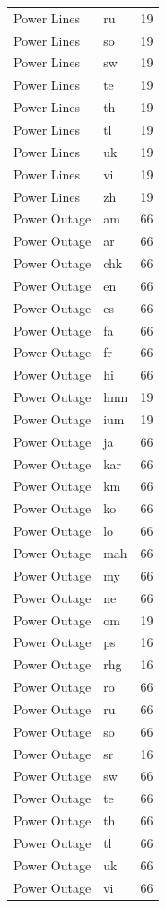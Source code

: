 \begin{longtable}{p{3cm} p{3cm} r}
Power Lines & ru & 19 \\
Power Lines & so & 19 \\
Power Lines & sw & 19 \\
Power Lines & te & 19 \\
Power Lines & th & 19 \\
Power Lines & tl & 19 \\
Power Lines & uk & 19 \\
Power Lines & vi & 19 \\
Power Lines & zh & 19 \\
Power Outage & am & 66 \\
Power Outage & ar & 66 \\
Power Outage & chk & 66 \\
Power Outage & en & 66 \\
Power Outage & es & 66 \\
Power Outage & fa & 66 \\
Power Outage & fr & 66 \\
Power Outage & hi & 66 \\
Power Outage & hmn & 19 \\
Power Outage & ium & 19 \\
Power Outage & ja & 66 \\
Power Outage & kar & 66 \\
Power Outage & km & 66 \\
Power Outage & ko & 66 \\
Power Outage & lo & 66 \\
Power Outage & mah & 66 \\
Power Outage & my & 66 \\
Power Outage & ne & 66 \\
Power Outage & om & 19 \\
Power Outage & ps & 16 \\
Power Outage & rhg & 16 \\
Power Outage & ro & 66 \\
Power Outage & ru & 66 \\
Power Outage & so & 66 \\
Power Outage & sr & 16 \\
Power Outage & sw & 66 \\
Power Outage & te & 66 \\
Power Outage & th & 66 \\
Power Outage & tl & 66 \\
Power Outage & uk & 66 \\
Power Outage & vi & 66 \\

\end{longtable}
